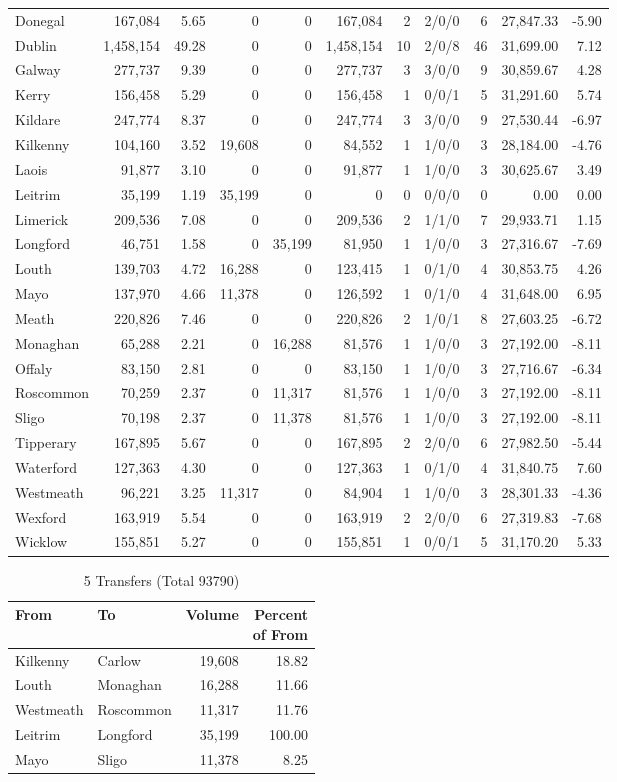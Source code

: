 \documentclass[a4paper]{article}
\begin{document}
\begin{longtable}{lrrrrrrlrrr}
Donegal&167,084& 5.65&0&0&167,084&2&2/0/0&6&27,847.33&-5.90\\ 
Dublin&1,458,154&49.28&0&0&1,458,154&10&2/0/8&46&31,699.00& 7.12\\ 
Galway&277,737& 9.39&0&0&277,737&3&3/0/0&9&30,859.67& 4.28\\ 
Kerry&156,458& 5.29&0&0&156,458&1&0/0/1&5&31,291.60& 5.74\\ 
Kildare&247,774& 8.37&0&0&247,774&3&3/0/0&9&27,530.44&-6.97\\ 
Kilkenny&104,160& 3.52&19,608&0&84,552&1&1/0/0&3&28,184.00&-4.76\\ 
Laois&91,877& 3.10&0&0&91,877&1&1/0/0&3&30,625.67& 3.49\\ 
Leitrim&35,199& 1.19&35,199&0&0&0&0/0/0&0& 0.00& 0.00\\ 
Limerick&209,536& 7.08&0&0&209,536&2&1/1/0&7&29,933.71& 1.15\\ 
Longford&46,751& 1.58&0&35,199&81,950&1&1/0/0&3&27,316.67&-7.69\\ 
Louth&139,703& 4.72&16,288&0&123,415&1&0/1/0&4&30,853.75& 4.26\\ 
Mayo&137,970& 4.66&11,378&0&126,592&1&0/1/0&4&31,648.00& 6.95\\ 
Meath&220,826& 7.46&0&0&220,826&2&1/0/1&8&27,603.25&-6.72\\ 
Monaghan&65,288& 2.21&0&16,288&81,576&1&1/0/0&3&27,192.00&-8.11\\ 
Offaly&83,150& 2.81&0&0&83,150&1&1/0/0&3&27,716.67&-6.34\\ 
Roscommon&70,259& 2.37&0&11,317&81,576&1&1/0/0&3&27,192.00&-8.11\\ 
Sligo&70,198& 2.37&0&11,378&81,576&1&1/0/0&3&27,192.00&-8.11\\ 
Tipperary&167,895& 5.67&0&0&167,895&2&2/0/0&6&27,982.50&-5.44\\ 
Waterford&127,363& 4.30&0&0&127,363&1&0/1/0&4&31,840.75& 7.60\\ 
Westmeath&96,221& 3.25&11,317&0&84,904&1&1/0/0&3&28,301.33&-4.36\\ 
Wexford&163,919& 5.54&0&0&163,919&2&2/0/0&6&27,319.83&-7.68\\ 
Wicklow&155,851& 5.27&0&0&155,851&1&0/0/1&5&31,170.20& 5.33\\ 
\end{longtable}

\begin{table}[htbp]
\caption{5 Transfers (Total 93790)}
\centering
\begin{tabular}{llrr} \toprule
From &To &Volume &\shortstack{Percent\\of From} \\ \midrule
Kilkenny&Carlow&19,608&18.82\\ 
Louth&Monaghan&16,288&11.66\\ 
Westmeath&Roscommon&11,317&11.76\\ 
Leitrim&Longford&35,199&100.00\\ 
Mayo&Sligo&11,378& 8.25\\ 
\bottomrule
\end{tabular}
\end{table}
\end{document}
